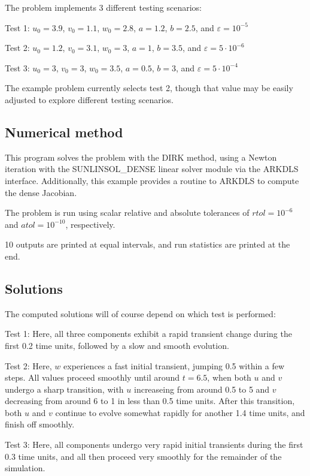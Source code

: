 \documentclass[letterpaper,10pt,english]{sphinxmanual}
\begin{document}
The problem implements 3 different testing scenarios:

Test 1:  \(u_0=3.9\),  \(v_0=1.1\),  \(w_0=2.8\),
\(a=1.2\), \(b=2.5\), and \(\varepsilon=10^{-5}\)

Test 2:  \(u_0=1.2\), \(v_0=3.1\), \(w_0=3\), \(a=1\),
\(b=3.5\), and \(\varepsilon=5\cdot10^{-6}\)

Test 3:  \(u_0=3\), \(v_0=3\), \(w_0=3.5\), \(a=0.5\),
\(b=3\), and \(\varepsilon=5\cdot10^{-4}\)

The example problem currently selects test 2, though that value may be
easily adjusted to explore different testing scenarios.


\subsection{Numerical method}
\label{\detokenize{c_serial:id6}}
This program solves the problem with the DIRK method, using a
Newton iteration with the SUNLINSOL\_DENSE linear solver module via
the ARKDLS interface.  Additionally, this example provides a routine
to ARKDLS to compute the dense Jacobian.

The problem is run using scalar relative and absolute tolerances of
\(rtol=10^{-6}\) and \(atol=10^{-10}\), respectively.

10 outputs are printed at equal intervals, and run statistics
are printed at the end.


\subsection{Solutions}
\label{\detokenize{c_serial:id7}}
The computed solutions will of course depend on which test is
performed:

Test 1:  Here, all three components exhibit a rapid transient change
during the first 0.2 time units, followed by a slow and smooth
evolution.

Test 2: Here, \(w\) experiences a fast initial transient, jumping
0.5 within a few steps.  All values proceed smoothly until around
\(t=6.5\), when both \(u\) and \(v\) undergo a sharp
transition, with \(u\) increaseing from around 0.5 to 5 and
\(v\) decreasing from around 6 to 1 in less than 0.5 time units.
After this transition, both \(u\) and \(v\) continue to evolve
somewhat rapidly for another 1.4 time units, and finish off smoothly.

Test 3: Here, all components undergo very rapid initial transients
during the first 0.3 time units, and all then proceed very smoothly
for the remainder of the simulation.
\end{document}
